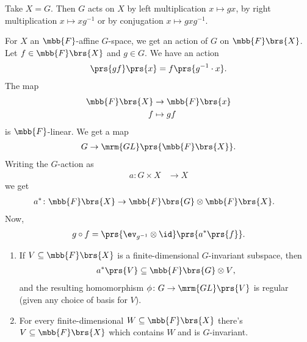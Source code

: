 \documentclass[10pt,a4paper,twoside,openany,hidelinks]{book}
\begin{document}
\begin{example}
Take $X = G$. Then $G$ acts on $X$ by left multiplication $x \mapsto gx$, by right multiplication $x \mapsto x g^{-1}$ or by conjugation $x \mapsto gxg^{-1}$.
\end{example}

For $X$ an $\mbb{F}$-affine $G$-space, we get an action of $G$ on $\mbb{F}\brs{X}$.
Let $f \in \mbb{F}\brs{X}$ and $g \in G$. We have an action
\begin{align*}
\prs{gf} \prs{x} = f\prs{g^{-1} \cdot x} \text{.}
\end{align*}
The map
\begin{align*}
\mbb{F}\brs{X} &\to \mbb{F}\brs{x} \\
f &\mapsto gf
\end{align*}
is $\mbb{F}$-linear.
We get a map
\begin{align*}
G \to \mrm{GL}\prs{\mbb{F}\brs{X}} \text{.}
\end{align*}
Writing the $G$-action as
\begin{align*}
a \colon G \times X &\to X
\end{align*}
we get
\begin{align*}
a^* \colon \mbb{F}\brs{X} &\to \mbb{F}\brs{G} \otimes \mbb{F}\brs{X} \text{.}
\end{align*}
Now,
\begin{align*}
g \circ f = \prs{\ev_{g^{-1}} \otimes \id}\prs{a^*\prs{f}} \text{.}
\end{align*}

\begin{proposition}
\begin{enumerate}
\item If $V \subseteq \mbb{F}\brs{X}$ is a finite-dimensional $G$-invariant subspace, then
\begin{align*}
a^*\prs{V} \subseteq \mbb{F}\brs{G} \otimes V \text{,}
\end{align*}
and the resulting homomorphism $\phi \colon G \to \mrm{GL}\prs{V}$ is regular (given any choice of basis for $V$).

\item For every finite-dimensional $W \subseteq \mbb{F}\brs{X}$ there's $V \subseteq \mbb{F}\brs{X}$ which contains $W$ and is $G$-invariant.
\end{enumerate}
\end{proposition}
\end{document}
